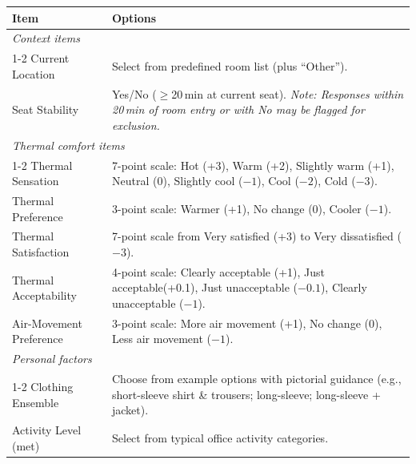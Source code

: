 \centering
\label{tab:survey_items} 
\small
\renewcommand{\arraystretch}{1.3} %
\begin{tabularx}{\textwidth}{l X}
\toprule
\textbf{Item} & \textbf{Options} \\
\midrule
\multicolumn{2}{l}{\textit{Context items}} \\
\cmidrule(r){1-2} %
Current Location & Select from predefined room list (plus ``Other''). \\
Seat Stability   & Yes/No ($\geq$20\,min at current seat). \textit{Note: Responses within 20\,min of room entry or with No may be flagged for exclusion.} \\
\midrule
\multicolumn{2}{l}{\textit{Thermal comfort items}} \\
\cmidrule(r){1-2}
Thermal Sensation      & 7-point scale: Hot (+3), Warm (+2), Slightly warm (+1), Neutral (0), Slightly cool ($-1$), Cool ($-2$), Cold ($-3$). \\
Thermal Preference     & 3-point scale: Warmer (+1), No change (0), Cooler ($-1$). \\
Thermal Satisfaction   & 7-point scale from Very satisfied (+3) to Very dissatisfied ($-3$). \\
Thermal Acceptability  & 4-point scale: Clearly acceptable (+1), Just acceptable(+0.1), Just unacceptable ($-0.1$), Clearly unacceptable ($-1$). \\
Air-Movement Preference & 3-point scale: More air movement (+1), No change (0), Less air movement ($-1$). \\
\midrule
\multicolumn{2}{l}{\textit{Personal factors}} \\
\cmidrule(r){1-2}
Clothing Ensemble & Choose from example options with pictorial guidance (e.g., short-sleeve shirt \& trousers; long-sleeve; long-sleeve + jacket). \\
Activity Level (met) & Select from typical office activity categories. \\
\bottomrule
\end{tabularx}
